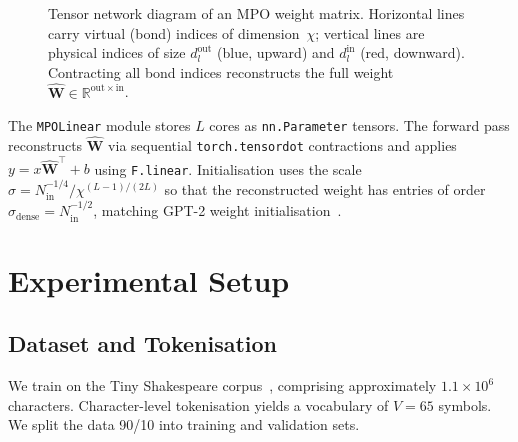 \documentclass[11pt,a4paper]{article}
\newcommand{\mpomat}[1]{\mathbf{#1}}
\newcommand{\R}{\mathbb{R}}
\theoremstyle{definition}
\begin{document}
\begin{figure}[H]
\caption{Tensor network diagram of an MPO weight matrix. Horizontal lines carry
virtual (bond) indices of dimension~$\chi$; vertical lines are physical indices
of size $d_l^{\mathrm{out}}$ (blue, upward) and $d_l^{\mathrm{in}}$ (red, downward).
Contracting all bond indices reconstructs the full weight
$\widehat{\mpomat{W}}\in\R^{\mathrm{out}\times\mathrm{in}}$.}
\label{fig:mpo_diagram}
\end{figure}

The \texttt{MPOLinear} module stores $L$ cores as \texttt{nn.Parameter} tensors. The forward pass reconstructs $\widehat{\mpomat{W}}$ via sequential \texttt{torch.tensordot} contractions and applies $y = x\widehat{\mpomat{W}}^\top + b$ using \texttt{F.linear}. Initialisation uses the scale $\sigma = N_\text{in}^{-1/4} / \chi^{(L-1)/(2L)}$ so that the reconstructed weight has entries of order $\sigma_\text{dense} = N_\text{in}^{-1/2}$, matching GPT-2 weight initialisation~\citep{radford2019language}.


\section{Experimental Setup}

\subsection{Dataset and Tokenisation}

We train on the Tiny Shakespeare corpus~\citep{karpathy2015unreasonable}, comprising approximately $1.1 \times 10^6$ characters. Character-level tokenisation yields a vocabulary of $V = 65$ symbols. We split the data 90/10 into training and validation sets.
\end{document}
